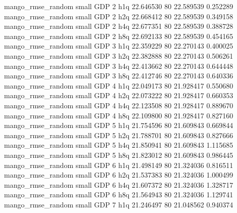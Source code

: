 mango_rmse_random      small      GDP                 2                  h1q 22.646530 80      22.589539           0.252289
mango_rmse_random      small      GDP                 2                  h2q 22.668412 80      22.589539           0.349158
mango_rmse_random      small      GDP                 2                  h4q 22.677351 80      22.589539           0.388728
mango_rmse_random      small      GDP                 2                  h8q 22.692133 80      22.589539           0.454165
mango_rmse_random      small      GDP                 3                  h1q 22.359229 80      22.270143           0.400025
mango_rmse_random      small      GDP                 3                  h2q 22.382888 80      22.270143           0.506261
mango_rmse_random      small      GDP                 3                  h4q 22.413662 80      22.270143           0.644448
mango_rmse_random      small      GDP                 3                  h8q 22.412746 80      22.270143           0.640336
mango_rmse_random      small      GDP                 4                  h1q 22.049173 80      21.928417           0.550680
mango_rmse_random      small      GDP                 4                  h2q 22.073222 80      21.928417           0.660353
mango_rmse_random      small      GDP                 4                  h4q 22.123508 80      21.928417           0.889670
mango_rmse_random      small      GDP                 4                  h8q 22.109800 80      21.928417           0.827160
mango_rmse_random      small      GDP                 5                  h1q 21.754596 80      21.609843           0.669844
mango_rmse_random      small      GDP                 5                  h2q 21.788701 80      21.609843           0.827666
mango_rmse_random      small      GDP                 5                  h4q 21.850941 80      21.609843           1.115685
mango_rmse_random      small      GDP                 5                  h8q 21.823012 80      21.609843           0.986445
mango_rmse_random      small      GDP                 6                  h1q 21.498149 80      21.324036           0.816511
mango_rmse_random      small      GDP                 6                  h2q 21.537383 80      21.324036           1.000499
mango_rmse_random      small      GDP                 6                  h4q 21.607372 80      21.324036           1.328717
mango_rmse_random      small      GDP                 6                  h8q 21.564943 80      21.324036           1.129741
mango_rmse_random      small      GDP                 7                  h1q 21.246497 80      21.048562           0.940374
